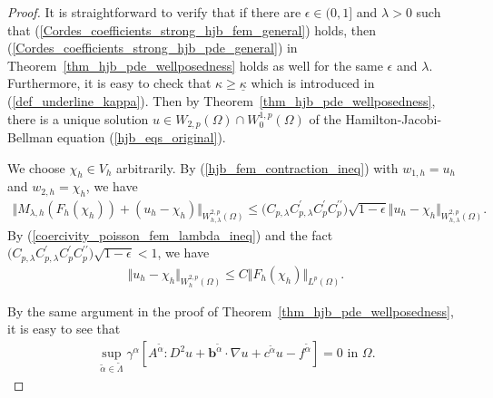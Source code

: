 \documentclass[12pt]{amsart}
\theoremstyle{definition}
\theoremstyle{remark}
\begin{document}
\begin{proof}
It is straightforward to verify that if there are 
$\epsilon \in (0,1]$ and $\lambda>0$ such that (\ref{Cordes_coefficients_strong_hjb_fem_general}) holds, then 
(\ref{Cordes_coefficients_strong_hjb_pde_general}) in Theorem~\ref{thm_hjb_pde_wellposedness} holds as well for the same 
$\epsilon$ and $\lambda$. Furthermore, it is easy to check that 
$\kappa \geq \underline{\kappa}$ which is introduced in (\ref{def_underline_kappa}). 
Then by Theorem~\ref{thm_hjb_pde_wellposedness}, there is a unique solution 
$u\in W_{2,p}(\Omega)\cap W_{0}^{1,p}(\Omega)$ of the Hamilton-Jacobi-Bellman 
equation (\ref{hjb_eqs_original}). 

We choose $\chi_{h} \in V_{h}$ arbitrarily. By (\ref{hjb_fem_contraction_ineq}) 
with $w_{1,h} = u_{h}$ and $w_{2,h}=\chi_{h}$, we have 
\begin{align*}
\Vert M_{\lambda,h}(F_{h}(\chi_{h})) + (u_{h} - \chi_{h}) \Vert_{W_{h,\lambda}^{2,p}
(\Omega)}\leq \big( C_{p,\lambda}C_{p,\lambda}^{\prime}C_{p}^{\prime}
C_{p}^{\prime\prime}\big)\sqrt{1-\epsilon} 
\Vert u_{h} - \chi_{h}\Vert_{W_{h,\lambda}^{2,p}(\Omega)}.
\end{align*}
By (\ref{coercivity_poisson_fem_lambda_ineq}) and the fact 
$\big( C_{p,\lambda}C_{p,\lambda}^{\prime}C_{p}^{\prime}
C_{p}^{\prime\prime}\big)\sqrt{1-\epsilon}<1$, we have 
\begin{align*}
\Vert u_{h} - \chi_{h}\Vert_{W_{h}^{2,p}(\Omega)} 
\leq C \Vert F_{h}(\chi_{h})\Vert_{L^{p}(\Omega)}.
\end{align*}

By the same argument in the proof of Theorem~\ref{thm_hjb_pde_wellposedness}, 
it is easy to see that 
\begin{align*}
\sup_{\tilde{\alpha}\in \tilde{\Lambda}}\gamma^{\alpha}
[A^{\tilde{\alpha}}:D^{2}u+\boldsymbol{b}^{\tilde{\alpha}}\cdot\nabla u 
+ c^{\tilde{\alpha}}u - f^{\tilde{\alpha}}] = 0 \text{ in } \Omega.
\end{align*}


\end{proof}
\end{document}
